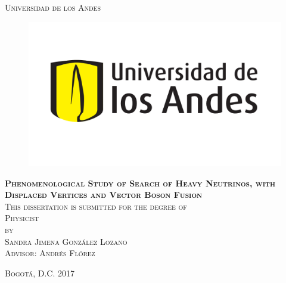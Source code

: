 \documentclass[11pt]{book}
\begin{document}
\begin{titlepage}
\begin{center}

\textsc{\Large Universidad de los Andes}\\[1em]

\begin{figure}[h]
\begin{center}
\includegraphics[scale=0.4]{logo_uniandes.png}
\end{center}
\end{figure}

\vspace{4em}

\textsc{\huge \textbf{Phenomenological Study of Search of Heavy Neutrinos, with Displaced Vertices and Vector Boson Fusion}}\\[4em]


\textsc{This dissertation is submitted for the degree of}\\[1em]

\textsc{Physicist}\\[1em]

\textsc{by}\\[1em]

\textsc{\Large Sandra Jimena González Lozano}\\[1em]

\textsc{\large Advisor: Andrés Flórez}

\end{center}

\vspace*{\fill}
\textsc{Bogotá, D.C. \hspace*{\fill} 2017}

\end{titlepage}
\end{document}
